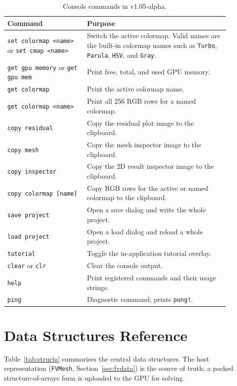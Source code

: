 \documentclass[11pt]{article}
\begin{document}
\begin{table}[h]
\centering
\caption{Console commands in v1.05-alpha.}
\label{tab:consolecmds}
\begin{tabular}{@{}>{\raggedright\arraybackslash}p{0.32\linewidth}
                   >{\raggedright\arraybackslash}p{0.58\linewidth}@{}}
\toprule
\textbf{Command} & \textbf{Purpose} \\
\midrule
\texttt{set colormap <name>} or \texttt{set cmap <name>}
  & Switch the active colormap. Valid names are the built-in colormap names such as \texttt{Turbo}, \texttt{Parula}, \texttt{HSV}, and \texttt{Gray}. \\
\texttt{get gpu memory} or \texttt{get gpu mem}
  & Print free, total, and used GPU memory. \\
\texttt{get colormap} & Print the active colormap name. \\
\texttt{get colormap <name>} & Print all 256 RGB rows for a named colormap. \\
\texttt{copy residual} & Copy the residual plot image to the clipboard. \\
\texttt{copy mesh} & Copy the mesh inspector image to the clipboard. \\
\texttt{copy inspector} & Copy the 2D result inspector image to the clipboard. \\
\texttt{copy colormap [name]} & Copy RGB rows for the active or named colormap to the clipboard. \\
\texttt{save project} & Open a save dialog and write the whole project. \\
\texttt{load project} & Open a load dialog and reload a whole project. \\
\texttt{tutorial} & Toggle the in-application tutorial overlay. \\
\texttt{clear} or \texttt{clr} & Clear the console output. \\
\texttt{help} & Print registered commands and their usage strings. \\
\texttt{ping} & Diagnostic command; prints \texttt{pong!}. \\
\bottomrule
\end{tabular}
\end{table}

\section{Data Structures Reference}
Table~\ref{tab:structs} summarises the central data structures. The host
representation (\texttt{FVMesh}, Section~\ref{sec:fvdata}) is the source of truth; a
packed structure-of-arrays form is uploaded to the GPU for solving.
\end{document}
